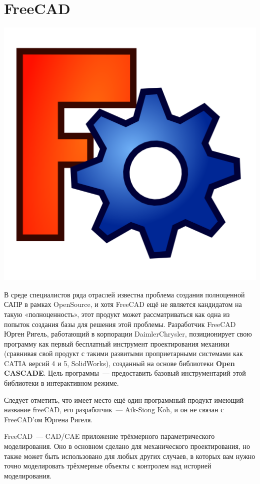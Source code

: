 \chapter{FreeCAD}

\includegraphics[height=0.5\textheight]{logo/FreeCAD.png}

В среде специалистов ряда отраслей известна проблема создания полноценной САПР в
рамках OpenSource, и хотя FreeCAD ещё не является кандидатом на такую
«полноценность», этот продукт может рассматриваться как одна из попыток создания
базы для решения этой проблемы. Разработчик FreeCAD Юрген Ригель, работающий в
корпорации DaimlerChrysler, позиционирует свою программу как первый бесплатный
инструмент проектирования механики (сравнивая свой продукт с такими развитыми
проприетарными системами как CATIA версий 4 и 5, SolidWorks), созданный на
основе библиотеки \textbf{Open CASCADE}. Цель программы\ --- предоставить
базовый инструментарий этой библиотеки в интерактивном режиме.

Следует отметить, что имеет место ещё один программный продукт имеющий название
freeCAD, его разработчик\ --- Aik-Siong Koh, и он не связан с FreeCAD’ом Юргена
Ригеля.

\bigskip{}
FreeCAD\ --- CAD/CAE приложение трёхмерного параметрического моделирования.
Оно в основном сделано для механического проектирования, но также может быть
использовано для любых других случаев, в которых вам нужно точно моделировать
трёхмерные объекты с контролем над историей моделирования.

